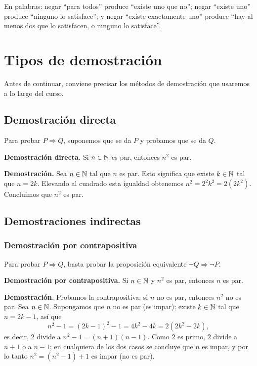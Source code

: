 \documentclass[12pt,a4paper]{book}
\begin{document}
    En palabras: negar ``para todos'' produce ``existe uno que no''; negar ``existe uno'' produce ``ninguno lo satisface''; y negar ``existe exactamente uno'' produce ``hay al menos dos que lo satisfacen, o ninguno lo satisface''.

    \chapter{Tipos de demostración}

    Antes de continuar, conviene precisar los métodos de demostración que usaremos a lo largo del curso.

    \section{Demostración directa}

    Para probar $P\Rightarrow Q$, suponemos que se da $P$ y probamos que se da $Q$.

    \begin{ejemplo}
        \textbf{Demostración directa.}
        Si $n\in\mathbb{N}$ es par, entonces $n^2$ es par.

        \textbf{Demostración.} Sea $n\in\mathbb{N}$ tal que $n$ es par. Esto significa que existe $k\in\mathbb{N}$ tal que $n=2k$. Elevando al cuadrado esta igualdad obtenemos $n^2 = 2^2k^2 = 2(2k^2)$. Concluimos que $n^2$ es par.
    \end{ejemplo}

    \section{Demostraciones indirectas}

    \subsection{Demostración por contrapositiva}

    Para probar $P\Rightarrow Q$, basta probar la proposición equivalente $\neg Q \Rightarrow \neg P$.

    \begin{ejemplo}
        \textbf{Demostración por contrapositiva.}
        Si $n\in\mathbb{N}$ y $n^2$ es par, entonces $n$ es par.

        \textbf{Demostración.} Probamos la contrapositiva: si $n$ no es par, entonces $n^2$ no es par. Sea $n\in\mathbb{N}$. Supongamos que $n$ no es par (es impar); existe $k\in\mathbb{N}$ tal que $n=2k-1$, así que
        \begin{equation*}
            n^2-1 = (2k-1)^2-1 = 4k^2-4k = 2(2k^2-2k),
        \end{equation*}
        es decir, $2$ divide a $n^2-1 = (n+1)(n-1)$. Como $2$ es primo, $2$ divide a $n+1$ o a $n-1$; en cualquiera de los dos casos se concluye que $n$ es impar, y por lo tanto $n^2 = (n^2-1)+1$ es impar (no es par).
    \end{ejemplo}
\end{document}
